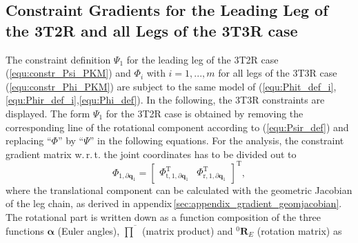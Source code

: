 \documentclass[robotics,article,submit,moreauthors,pdftex]{Definitions/mdpi}
\newcommand{\bm}[1]{\boldsymbol{#1}}
\newcommand{\rotmat}[2]{{{ }^{#1}\boldsymbol{R}}_{#2}}
\newcommand{\transp}[0]{{\mathrm{T}}}
\let\Phi\varPhi
\let\Psi\varPsi
\begin{document}
\subsection{Constraint Gradients for the Leading Leg of the 3T2R and all Legs of the 3T3R case}
%
The constraint definition $\bm{\Psi}_1$ for the leading leg of the 3T2R case (\ref{equ:constr_Psi_PKM}) and $\bm{\Phi}_i$ with $i=1,...,m$ for all legs of the 3T3R case (\ref{equ:constr_Phi_PKM}) are subject to the same model of (\ref{equ:Phit_def_i},\ref{equ:Phir_def_i},\ref{equ:Phi_def}).
In the following, the 3T3R constraints are displayed.
The form $\bm{\Psi}_1$ for the 3T2R case is obtained by removing the corresponding line of the rotational component according to (\ref{equ:Psir_def}) and replacing ``$\bm{\Phi}$'' by ``$\bm{\Psi}$'' in the following equations.
For the analysis, the constraint gradient matrix w.\,r.\,t. the joint coordinates has to be divided out to
%
\begin{equation}
\bm{\Phi}_{1,\partial\bm{q}_1}
=
\begin{bmatrix}
\bm{\Phi}_{\mathrm{t},1,\partial\bm{q}_1}^\transp
&
\bm{\Phi}_{\mathrm{r},1,\partial\bm{q}_1}^\transp
\end{bmatrix}^\transp,
\label{equ:Phi_1_grad_q}
\end{equation}
%
where the translational component can be calculated with the geometric Jacobian of the leg chain, as derived in appendix\,\ref{sec:appendix_gradient_geomjacobian}. %
The rotational part is written down as a function composition of the three functions $\bm{\alpha}$ (Euler angles), $\overline{\prod}$ (matrix product) and $\rotmat{0}{E}$ (rotation matrix) as%

\end{document}

